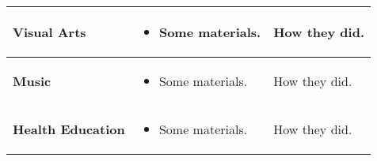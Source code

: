 \documentclass[10pt]{article}
\begin{document}
\begin{tabularx}{\textwidth}{ |p{2in}|X|X| }
{\bf Visual Arts} &
\begin{itemize}
\item Some materials.
\end{itemize} &

How they did. \\

\hline

{\bf Music} &
\begin{itemize}
\item Some materials.
\end{itemize} &

How they did. \\

\hline

{\bf Health Education} &
\begin{itemize}
\item Some materials.
\end{itemize} &

How they did. \\

\hline

\end{tabularx}
\end{document}
